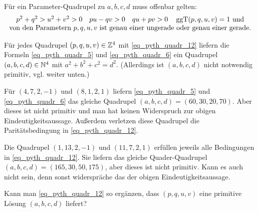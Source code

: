 	Für ein Parameter-Quadrupel zu $a,b,c,d$ muss offenbar gelten:
	\begin{equation}
		\begin{array}{c}
			p^2+q^2 > u^2+v^2 > 0 \quad pu - qv > 0 \quad qu+pv > 0 \quad \operatorname{ggT}(p,q,u,v)=1 \text{ und} \\
			\text{von den Parametern } p,q,u,v \text{ ist genau einer ungerade oder genau einer gerade.} \label{eq_pyth_quadr_12}
		\end{array}
	\end{equation}
	
	Für jedes Quadrupel $(p,q,u,v) \in \mathbb{Z}^4$ mit \eqref{eq_pyth_quadr_12} liefern die Formeln \eqref{eq_pyth_quadr_5} und \eqref{eq_pyth_quadr_6} ein Quadrupel $(a,b,c,d) \in \mathbb{N}^4$ mit $a^2+b^2+c^2 = d^2$. (Allerdings ist $(a,b,c,d)$ nicht notwendig primitiv, vgl. weiter unten.)
	
	Für $(4,7,2,-1)$ und $(8,1,2,1)$ liefern \eqref{eq_pyth_quadr_5} und \eqref{eq_pyth_quadr_6} das gleiche Quadrupel $(a,b,c,d) = (60,30,20,70)$. Aber dieses ist nicht primitiv und man hat keinen Widerspruch zur obigen Eindeutigkeitsaussage. Außerdem verletzen diese Quadrupel die Paritätsbedingung in \eqref{eq_pyth_quadr_12}.
	
	Die Quadrupel $(1,13,2,-1)$ und $(11,7,2,1)$ erfüllen jeweils alle Bedingungen in \eqref{eq_pyth_quadr_12}. Sie liefern das gleiche Quader-Quadrupel $(a,b,c,d) = (165, 30, 50, 175)$, aber dieses ist nicht primitiv. Kann es auch nicht sein, denn sonst widerspräche das der obigen Eindeutigkeitsaussage.
	
	Kann man \eqref{eq_pyth_quadr_12} so ergänzen, dass $(p,q,u,v)$ eine primitive Lösung $(a,b,c,d)$ liefert?
\cleardoubleemptypage